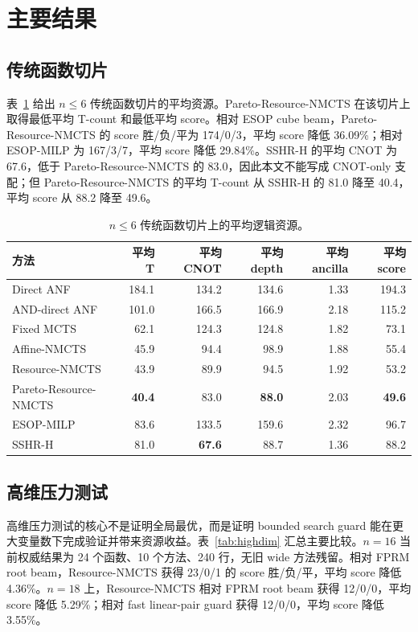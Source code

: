 \documentclass[UTF8,fontset=macnew,11pt]{ctexart}
\newcommand{\method}{Resource-NMCTS}
\newcommand{\pareto}{Pareto-Resource-NMCTS}
\begin{document}
\section{主要结果}

\subsection{传统函数切片}

表~\ref{tab:traditional} 给出 $n\leq6$ 传统函数切片的平均资源。\pareto{} 在该切片上取得最低平均 T-count 和最低平均 score。相对 ESOP cube beam，\pareto{} 的 score 胜/负/平为 174/0/3，平均 score 降低 36.09\%；相对 ESOP-MILP 为 167/3/7，平均 score 降低 29.84\%。SSHR-H 的平均 CNOT 为 67.6，低于 \pareto{} 的 83.0，因此本文不能写成 CNOT-only 支配；但 \pareto{} 的平均 T-count 从 SSHR-H 的 81.0 降至 40.4，平均 score 从 88.2 降至 49.6。

\begin{table}[t]
\centering
\small
\caption{$n\leq6$ 传统函数切片上的平均逻辑资源。}
\label{tab:traditional}
\begin{tabular}{lrrrrr}
\toprule
方法 & 平均 T & 平均 CNOT & 平均 depth & 平均 ancilla & 平均 score \\
\midrule
Direct ANF & 184.1 & 134.2 & 134.6 & 1.33 & 194.3 \\
AND-direct ANF & 101.0 & 166.5 & 166.9 & 2.18 & 115.2 \\
Fixed MCTS & 62.1 & 124.3 & 124.8 & 1.82 & 73.1 \\
Affine-NMCTS & 45.9 & 94.4 & 98.9 & 1.88 & 55.4 \\
\method{} & 43.9 & 89.9 & 94.5 & 1.92 & 53.2 \\
\pareto{} & \textbf{40.4} & 83.0 & \textbf{88.0} & 2.03 & \textbf{49.6} \\
ESOP-MILP & 83.6 & 133.5 & 159.6 & 2.32 & 96.7 \\
SSHR-H & 81.0 & \textbf{67.6} & 88.7 & 1.36 & 88.2 \\
\bottomrule
\end{tabular}
\end{table}

\subsection{高维压力测试}

高维压力测试的核心不是证明全局最优，而是证明 bounded search guard 能在更大变量数下完成验证并带来资源收益。表~\ref{tab:highdim} 汇总主要比较。$n=16$ 当前权威结果为 24 个函数、10 个方法、240 行，无旧 wide 方法残留。相对 FPRM root beam，\method{} 获得 23/0/1 的 score 胜/负/平，平均 score 降低 4.36\%。$n=18$ 上，\method{} 相对 FPRM root beam 获得 12/0/0，平均 score 降低 5.29\%；相对 fast linear-pair guard 获得 12/0/0，平均 score 降低 3.55\%。
\end{document}
